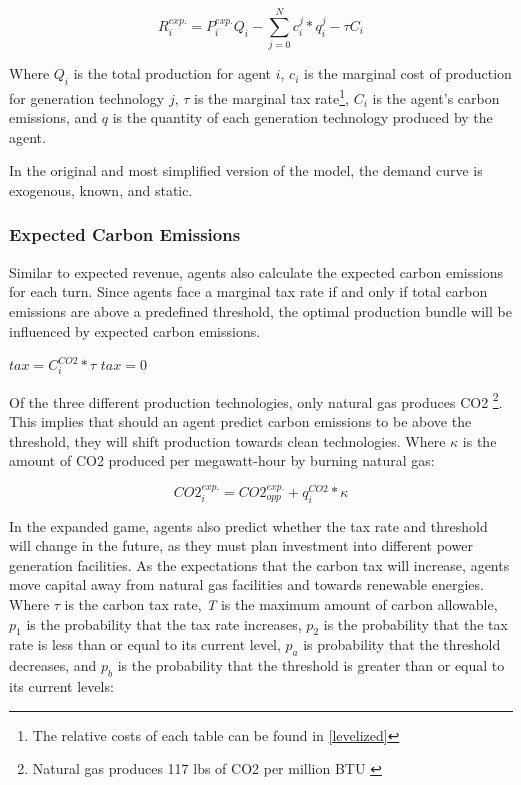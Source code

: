 \documentclass[12pt]{article}
\begin{document}
	\begin{equation}
		R^{exp.}_{i} = P^{exp.}_{i}Q_{i} - \sum_{j=0}^{N} c_{i}^{j}*q^{j}_{i} - \tau C_i
	\end{equation}

Where $Q_{i}$ is the total production for agent $i$, $c_i$ is the marginal cost of production for generation technology $j$, $\tau$ is the marginal tax rate\footnote{The relative costs of each table can be found in \cref{levelized}}, $C_{i}$ is the agent's carbon emissions, and $q$ is the quantity of each generation technology produced by the agent.\*

In the original and most simplified version of the model, the demand curve is exogenous, known, and static.

\subsubsection{Expected Carbon Emissions}\label{carbon}
Similar to expected revenue, agents also calculate the expected carbon emissions for each turn. Since agents face a marginal tax rate if and only if total carbon emissions are above a predefined threshold, the optimal production bundle will be influenced by expected carbon emissions. 

	\begin{algorithmic}
			\State $tax = C^{CO2}_i * \tau$
		\Else
			\State $tax=0$
		\EndIf
	\end{algorithmic}
Of the three different production technologies, only natural gas produces CO2 \footnote {Natural gas produces 117 lbs of CO2 per million BTU \cite{co2}}. This implies that should an agent predict carbon emissions to be above the threshold, they will shift production towards clean technologies. Where $\kappa$ is the amount of CO2 produced per megawatt-hour by burning natural gas:

	\begin{equation}
		CO2^{exp.}_{i} = CO2^{exp.}_{opp} + q^{CO2}_{i}*\kappa
	\end{equation}

In the expanded game, agents also predict whether the tax rate and threshold will change in the future, as they must plan investment into different power generation facilities. As the expectations that the carbon tax will increase, agents move capital away from natural gas facilities and towards renewable energies. Where $\tau$ is the carbon tax rate, \emph{T} is the maximum amount of carbon allowable, $p_1$ is the probability that the tax rate increases, $p_2$  is the probability that the tax rate is less than or equal to its current level, $p_a$ is probability that the threshold decreases, and $p_b$ is the probability that the threshold is greater than or equal to its current levels:
\end{document}
